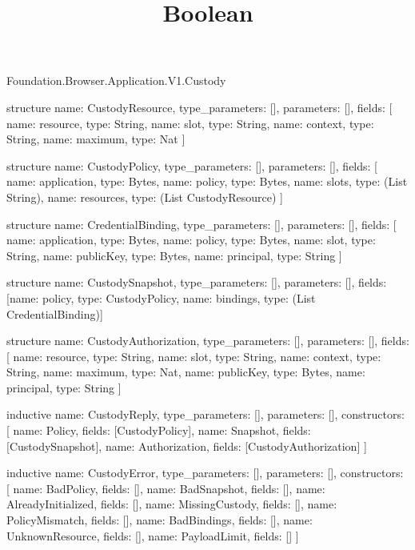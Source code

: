 \begin{lexlean}{Foundation.Browser.Application.V1.Custody}
\title{Boolean}
\begin{semanticmodule}
structure{
  name: CustodyResource,
  type_parameters: [],
  parameters: [],
  fields: [
    {name: resource, type: String},
    {name: slot, type: String},
    {name: context, type: String},
    {name: maximum, type: Nat}
  ]
}

structure{
  name: CustodyPolicy,
  type_parameters: [],
  parameters: [],
  fields: [
    {name: application, type: Bytes},
    {name: policy, type: Bytes},
    {name: slots, type: (List String)},
    {name: resources, type: (List CustodyResource)}
  ]
}

structure{
  name: CredentialBinding,
  type_parameters: [],
  parameters: [],
  fields: [
    {name: application, type: Bytes},
    {name: policy, type: Bytes},
    {name: slot, type: String},
    {name: publicKey, type: Bytes},
    {name: principal, type: String}
  ]
}

structure{
  name: CustodySnapshot,
  type_parameters: [],
  parameters: [],
  fields: [{name: policy, type: CustodyPolicy}, {name: bindings, type: (List CredentialBinding)}]
}

structure{
  name: CustodyAuthorization,
  type_parameters: [],
  parameters: [],
  fields: [
    {name: resource, type: String},
    {name: slot, type: String},
    {name: context, type: String},
    {name: maximum, type: Nat},
    {name: publicKey, type: Bytes},
    {name: principal, type: String}
  ]
}

inductive{
  name: CustodyReply,
  type_parameters: [],
  parameters: [],
  constructors: [
    {name: Policy, fields: [CustodyPolicy]},
    {name: Snapshot, fields: [CustodySnapshot]},
    {name: Authorization, fields: [CustodyAuthorization]}
  ]
}

inductive{
  name: CustodyError,
  type_parameters: [],
  parameters: [],
  constructors: [
    {name: BadPolicy, fields: []},
    {name: BadSnapshot, fields: []},
    {name: AlreadyInitialized, fields: []},
    {name: MissingCustody, fields: []},
    {name: PolicyMismatch, fields: []},
    {name: BadBindings, fields: []},
    {name: UnknownResource, fields: []},
    {name: PayloadLimit, fields: []}
  ]
}


\end{semanticmodule}
\end{lexlean}
